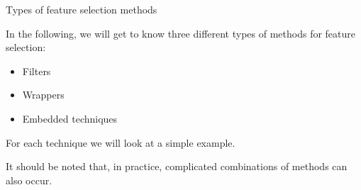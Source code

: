 \documentclass[11pt,compress,t,notes=noshow, xcolor=table]{beamer}
\begin{document}
  \begin{vbframe}{Types of feature selection methods}

  In the following, we will get to know three different types of methods for feature selection:

  \lz

  \begin{itemize}
    \item Filters
    \item Wrappers
    \item Embedded techniques
  \end{itemize}

  \lz

  For each technique we will look at a simple example.

  \lz

  It should be noted that, in practice, complicated combinations of methods can also occur.

  \end{vbframe}

  \endlecture
\end{document}
